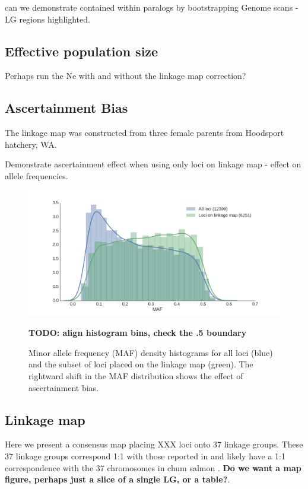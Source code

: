 \documentclass[12pt,  one column]{article}
\begin{document}
can we demonstrate contained within paralogs by bootstrapping 
Genome scans - LG regions highlighted.

\subsection*{Effective population size}


Perhaps run the Ne with and without the linkage map correction?

\subsection*{Ascertainment Bias}
The linkage map was constructed from three female parents from Hoodsport hatchery, WA.

Demonstrate ascertainment effect when using only loci on linkage map - effect on allele frequencies.

\begin{figure}[H]
\includegraphics[scale=.3]{figures/supplemental/ascertainment.png}
\caption{Minor allele frequency (MAF) density histograms for all loci (blue) and the subset of loci placed on the linkage map (green). The rightward shift in the MAF distribution shows the effect of ascertainment bias.} \textbf{TODO: align histogram bins, check the .5 boundary}
\end{figure}

\subsection*{Linkage map}
Here we present a consensus map placing XXX loci onto 37 linkage groups.  These 37 linkage groups correspond 1:1 with those reported in \citep{Waples2015} and likely have a 1:1 correspondence with the 37 chromosomes in chum salmon \citep{Phillips2001}. \textbf{Do we want a map figure, perhaps just a slice of a single LG, or a table?}.
\end{document}

